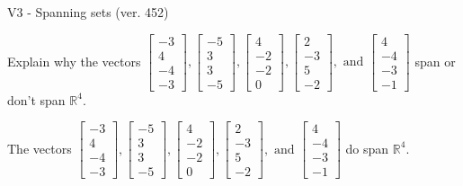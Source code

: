\begin{exercise}
  \begin{exerciseTitle}V3 - Spanning sets (ver. 452)\end{exerciseTitle}
  \begin{exerciseStatement}
    Explain why the vectors \(\left[\begin{array}{r}
-3 \\
4 \\
-4 \\
-3
\end{array}\right] , \left[\begin{array}{r}
-5 \\
3 \\
3 \\
-5
\end{array}\right] , \left[\begin{array}{r}
4 \\
-2 \\
-2 \\
0
\end{array}\right] , \left[\begin{array}{r}
2 \\
-3 \\
5 \\
-2
\end{array}\right] , \text{ and } \left[\begin{array}{r}
4 \\
-4 \\
-3 \\
-1
\end{array}\right]\) span or don't span \(\mathbb{R}^4\). 
	


  \end{exerciseStatement}
  \begin{exerciseAnswer}
   The vectors \(\left[\begin{array}{r}
-3 \\
4 \\
-4 \\
-3
\end{array}\right] , \left[\begin{array}{r}
-5 \\
3 \\
3 \\
-5
\end{array}\right] , \left[\begin{array}{r}
4 \\
-2 \\
-2 \\
0
\end{array}\right] , \left[\begin{array}{r}
2 \\
-3 \\
5 \\
-2
\end{array}\right] , \text{ and } \left[\begin{array}{r}
4 \\
-4 \\
-3 \\
-1
\end{array}\right]\) 
  	 do  
	span \(\mathbb{R}^4\).
  



\end{exerciseAnswer}
\end{exercise}
